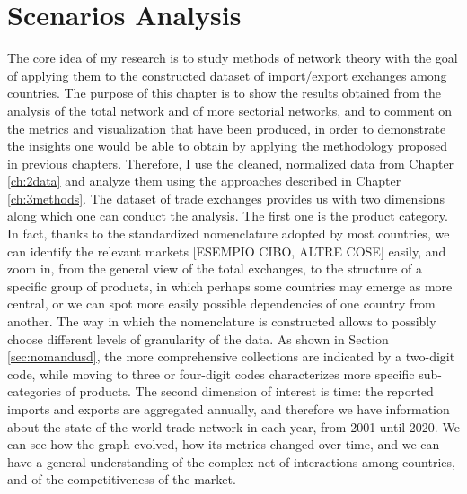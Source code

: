 \chapter{Scenarios Analysis}




The core idea of my research is to study methods of network theory with the goal of applying them to the constructed dataset of import/export exchanges among countries. The purpose of this chapter is to show the results obtained from the analysis of the total network and of more sectorial networks, and to comment on the metrics and visualization that have been produced, in order to demonstrate the insights one would be able to obtain by applying the methodology proposed in previous chapters. Therefore, I use the cleaned, normalized data from Chapter \ref{ch:2data} and analyze them using the approaches described in Chapter \ref{ch:3methods}.
The dataset of trade exchanges provides us with two dimensions along which one can conduct the analysis. The first one is the product category. In fact, thanks to the standardized nomenclature adopted by most countries, we can identify the relevant markets [ESEMPIO CIBO, ALTRE COSE] easily, and zoom in, from the general view of the total exchanges, to the structure of a specific group of products, in which perhaps some countries may emerge as more central, or we can spot more easily possible dependencies of one country from another. The way in which the nomenclature is constructed allows to possibly choose different levels of granularity of the data. As shown in Section \ref{sec:nomandusd}, the more comprehensive collections are indicated by a two-digit code, while moving to three or four-digit codes characterizes more specific sub-categories of products. 
The second dimension of interest is time: the reported imports and exports are aggregated annually, and therefore we have information about the state of the world trade network in each year, from 2001 until 2020. We can see how the graph evolved, how its metrics changed over time, and we can have a general understanding of the complex net of interactions among countries, and of the competitiveness of the market.

